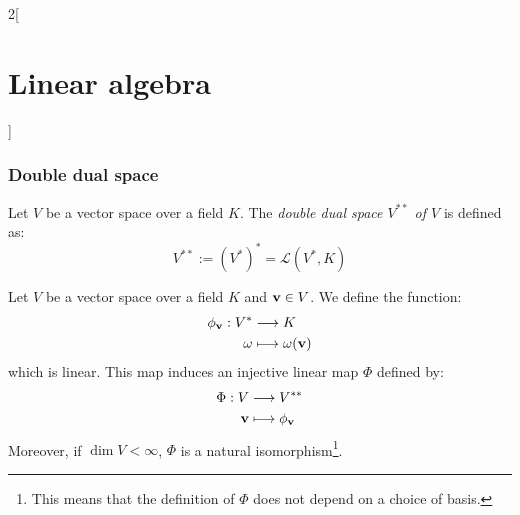 \documentclass[../../../main.tex]{subfiles}
\begin{document}
\begin{multicols}{2}[\section{Linear algebra}]
  \subsubsection*{Double dual space}
  \begin{definition}
    Let $V$ be a vector space over a field $K$. The \textit{double dual space $V^{**}$ of $V$} is defined as: $$V^{**}:=({V^*})^*=\mathcal{L}(V^*,K)$$
  \end{definition}
  \begin{prop}
    Let $V$ be a vector space over a field $K$ and $\vb{v}\in V$. We define the function:
    \begin{align*}
      \phi_{\vb{v}}:V^* & \longrightarrow K                \\
      \omega                   & \longmapsto\omega(\vb{v})
    \end{align*}
    which is linear. This map induces an injective linear map $\Phi$ defined by:
    \begin{align*}
      \Phi:V        & \longrightarrow V^{**}          \\
      \vb{v} & \longmapsto\phi_{\vb{v}}
    \end{align*}
    Moreover, if $\dim V<\infty$, $\Phi$ is a natural isomorphism\footnote{This means that the definition of $\Phi$ does not depend on a choice of basis.}.
  \end{prop}

\end{multicols}
\end{document}
